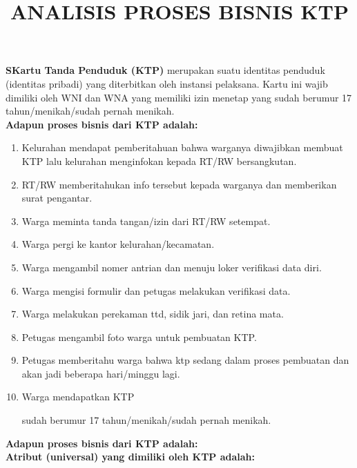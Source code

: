 \documentclass[12pt,a4paper,bahasa]{article}
\begin{document}
\title{ANALISIS PROSES BISNIS KTP}
\maketitle

\textbf{SKartu Tanda Penduduk (KTP)} merupakan suatu identitas penduduk (identitas pribadi) yang diterbitkan oleh instansi pelaksana. Kartu ini wajib dimiliki oleh WNI dan WNA yang memiliki izin menetap yang sudah berumur 17 tahun/menikah/sudah pernah menikah.\\

\textbf{Adapun proses bisnis dari KTP adalah:}

\begin {enumerate}

\item Kelurahan mendapat pemberitahuan bahwa warganya diwajibkan membuat KTP lalu kelurahan menginfokan kepada RT/RW bersangkutan.
\item RT/RW memberitahukan info tersebut kepada warganya dan memberikan surat pengantar.
\item Warga meminta tanda tangan/izin dari RT/RW setempat.
\item Warga pergi ke kantor kelurahan/kecamatan.
\item Warga mengambil nomer antrian dan menuju loker verifikasi data diri.
\item Warga mengisi formulir dan petugas melakukan verifikasi data.
\item Warga melakukan perekaman ttd, sidik jari, dan retina mata.
\item Petugas mengambil foto warga untuk pembuatan KTP.
\item Petugas memberitahu warga bahwa ktp sedang dalam proses pembuatan dan akan jadi beberapa hari/minggu lagi.
\item Warga mendapatkan KTP

sudah berumur 17 tahun/menikah/sudah pernah menikah.

\end{enumerate}
\textbf{Adapun proses bisnis dari KTP adalah:}\\
\textbf{Atribut (universal) yang dimiliki oleh KTP adalah:}\\
\end{document}
